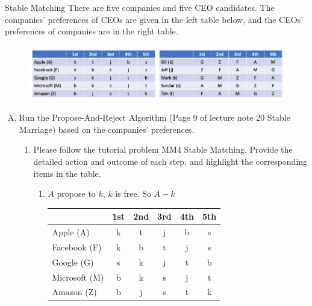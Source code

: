 \documentclass{article}
\numberwithin{table}{section}
\numberwithin{figure}{section}
\begin{document}
\newpage
\begin{section}{Stable Matching}
    There are five companies and five CEO candidates. The companies’ preferences of CEOs are given in the left table below, and the CEOs’ preferences of companies are in the right table.

    \begin{figure}[H]
        \centering
        \includegraphics[width=\linewidth]{figures/p5/1.png}
    \end{figure}
    
    \begin{enumerate} [(A)]
        \item Run the Propose-And-Reject Algorithm (Page 9 of lecture note 20 Stable Marriage) based on the companies’ preferences.
        
        \begin{enumerate}[(1)]
            \item Please follow the tutorial problem MM4 Stable Matching. Provide the detailed action and outcome of each step, and highlight the corresponding items in the table.
            
            \begin{tcolorbox}[breakable]
                \begin{enumerate}[(1)]
                    \item $A$ propose to $k$, $k$ is free. So $A-k$
                    \begin{table}[H]
                        \centering
                        \begin{tabular}{|m{2.5cm}|*{5}{c|}}
                            \hline
                            & 1st & 2nd & 3rd & 4th & 5th \\
                            \hline
                            Apple (A)        & {\color{red} k} & t & j & b & s \\
                            Facebook (F)     & k & b & t & j & s \\
                            Google (G)       & s & k & j & t & b \\
                            Microsoft (M)    & b & k & s & j & t \\
                            Amazon (Z)       & b & j & s & t & k \\
                            \hline                            
                        \end{tabular}
                    \end{table}


\end{enumerate}
\end{tcolorbox}
\end{enumerate}
\end{enumerate}
\end{section}
\end{document}
